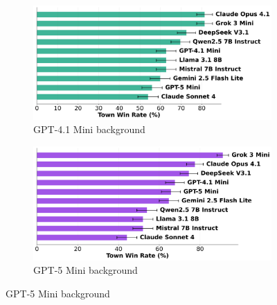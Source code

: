 \documentclass{article}
\begin{document}
\begin{figure}[htbp]
    \centering
    \begin{subfigure}[b]{0.48\textwidth}
        \centering
        \includegraphics[width=\textwidth]{../results/villager_gpt-4.1_mini_db_benchmark.png}
        \caption{GPT-4.1 Mini background}
        \label{fig:villager_gpt41mini_appendix}
    \end{subfigure}
    \hfill
    \begin{subfigure}[b]{0.48\textwidth}
        \centering
        \includegraphics[width=\textwidth]{../results/villager_grok_3_mini_db_benchmark.png}
        \caption{GPT-5 Mini background}
        \label{fig:villager_gpt5mini_appendix}
    \end{subfigure}
    
    \vspace{0.5cm}
    

\end{figure}
\end{document}
